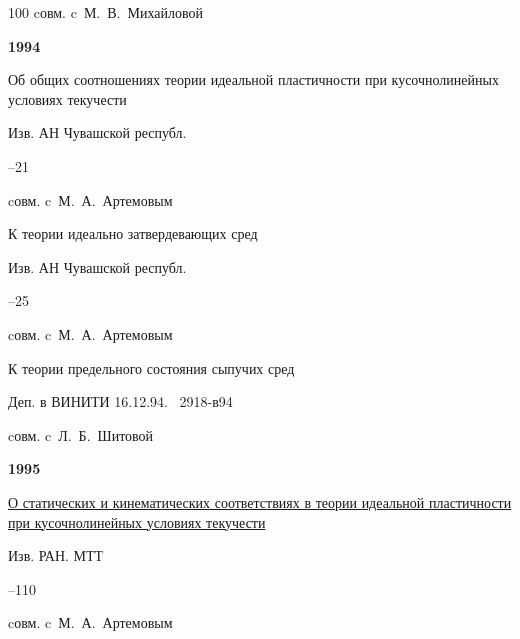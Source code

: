\begin{thebibliography}{100}
\miscnote cовм. c~М.~В.~Михайловой



\item[] \centerline{\bf 1994}




\paper Об общих соотношениях теории идеальной пластичности при кусочнолинейных условиях текучести 

\jour Изв. АН Чувашской республ.



–21 

\miscnote cовм. c~М.~А.~Артемовым




\paper К теории идеально затвердевающих сред 

\jour Изв. АН Чувашской республ. 



–25 

\miscnote cовм. c~М.~А.~Артемовым




\preprint К теории предельного состояния сыпучих сред 

\preprintinfo Деп. в ВИНИТИ 16.12.94. \No\ 2918-в94


\miscnote cовм. c~Л.~Б.~Шитовой



\item[] \centerline{\bf 1995}




\paper  \href{http://elibrary.ru/item.asp?id=26054988}{О статических и кинематических соответствиях в теории идеальной пластичности при кусочнолинейных условиях текучести}


\jour Изв. РАН. МТТ



–110 

\miscnote cовм. c~М.~А.~Артемовым





\end{thebibliography}
